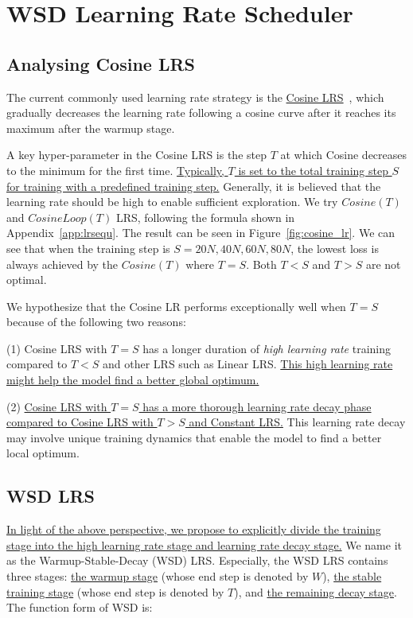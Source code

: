\section{WSD Learning Rate Scheduler}
\label{sec:wsdlrs}
\subsection{Analysing Cosine LRS}

The current commonly used learning rate strategy is the \uline{Cosine LRS}~\citep{kaplan2020scaling, hoffmann2022training, rae2021scaling, touvron2023llama, bai2023qwen, almazrouei2023falcon}, which gradually decreases the learning rate following a cosine curve after it reaches its maximum after the warmup stage. 

A key hyper-parameter in the Cosine LRS is the step $T$ at which Cosine decreases to the minimum for the first time. \uline{Typically, $T$ is set to the total training step $S$ for training with a predefined training step.} Generally, it is believed that the learning rate should be high to enable sufficient exploration. We try $Cosine(T)$ and $CosineLoop(T)$ LRS, following the formula shown in Appendix~\ref{app:lrsequ}. The result can be seen in Figure~\ref{fig:cosine_lr}. We can see that when the training step is $S=20N, 40N, 60N, 80N$, the lowest loss is always achieved by the $Cosine(T)$ where $T = S$. Both $T<S$ and $T>S$ are not optimal. 

We hypothesize that the Cosine LR performs exceptionally well when $T = S$ because of the following two reasons: 

(1) Cosine LRS with $T = S$ has a longer duration of \textit{high learning rate} training compared to $T < S$ and other LRS such as Linear LRS. \uline{This high learning rate might help the model find a better global optimum.}

(2) \uline{Cosine LRS with $T = S$ has a more thorough learning rate decay phase compared to Cosine LRS with $T > S$ and Constant LRS.} This learning rate decay may involve unique training dynamics that enable the model to find a better local optimum.

\subsection{WSD LRS}

\uline{In light of the above perspective, we propose to explicitly divide the training stage into the high learning rate stage and learning rate decay stage.} We name it as the Warmup-Stable-Decay (WSD) LRS.  Especially, the WSD LRS contains three stages: \uline{the warmup stage} (whose end step is denoted by $W$), \uline{the stable training stage} (whose end step is denoted by $T$), and \uline{the remaining decay stage}. The function form of WSD is:

